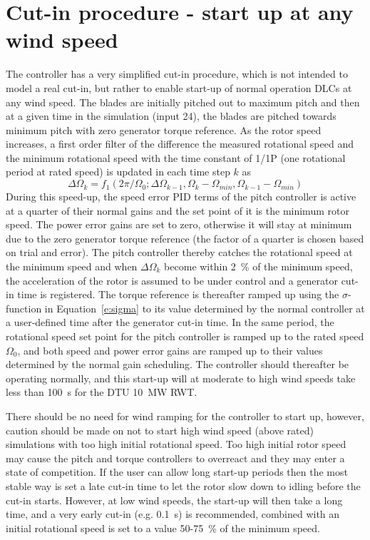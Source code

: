\section{Cut-in procedure - start up at any wind speed}

The controller has a very simplified cut-in procedure, which is not intended to model a real cut-in, but rather to enable start-up of normal operation DLCs at any wind speed. The blades are initially pitched out to maximum pitch and then at a given time in the simulation (input 24), the blades are pitched towards minimum pitch with zero generator torque reference. As the rotor speed increases, a first order filter of the difference the measured rotational speed and the minimum rotational speed with the time constant of 1/1P (one rotational period at rated speed) is updated in each time step $k$ as
\begin{equation}
\label{e:speedtrack}
\Delta \Omega_k = f_1 \left(2\pi/\Omega_0; \Delta \Omega_{k-1} , \Omega_{k}-\Omega_{min} , \Omega_{k-1}-\Omega_{min}\right)
\end{equation}
During this speed-up, the speed error PID terms of the pitch controller is active at a quarter of their normal gains and the set point of it is the minimum rotor speed. The power error gains are set to zero, otherwise it will stay at minimum due to the zero generator torque reference (the factor of a quarter is chosen based on trial and error). The pitch controller thereby catches the rotational speed at the minimum speed and when $\Delta \Omega_k$ become within 2~\% of the minimum speed, the acceleration of the rotor is assumed to be under control and a generator cut-in time is registered. The torque reference is thereafter ramped up using the $\sigma$-function in Equation~\eqref{e:sigma} to its value determined by the normal controller at a user-defined time after the generator cut-in time. In the same period, the rotational speed set point for the pitch controller is ramped up to the rated speed $\Omega_0$, and both speed and power error gains are ramped up to their values determined by the normal gain scheduling. The controller should thereafter be operating normally, and this start-up will at moderate to high wind speeds take less than 100~s for the DTU 10~MW RWT.

There should be no need for wind ramping for the controller to start up, however, caution should be made on not to start high wind speed (above rated) simulations with too high initial rotational speed. Too high initial rotor speed may cause the pitch and torque controllers to overreact and they may enter a state of competition. If the user can allow long start-up periods then the most stable way is set a late cut-in time to let the rotor slow down to idling before the cut-in starts. However, at low wind speeds, the start-up will then take a long time, and a very early cut-in (e.g. 0.1~s) is recommended, combined with an initial rotational speed is set to a value 50-75~\% of the minimum speed.


